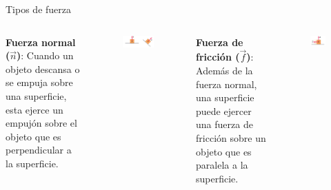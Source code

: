 \begin{frame}{Tipos de fuerza}

\begin{columns}
    \textbf{Fuerza normal ($\vec{n}$)}: Cuando un objeto descansa o se empuja sobre una superficie, esta ejerce un empujón sobre el objeto que es perpendicular a la superficie.
    \begin{figure}
        \centering
        \includegraphics[width=0.8\linewidth]{figures/normal.png}
    \end{figure}
    
    \textbf{Fuerza de fricción ($\vec{f}$)}: Además de la fuerza normal, una superficie puede ejercer una fuerza de fricción sobre un objeto que es paralela a la superficie.
    \begin{figure}
        \centering
        \includegraphics[width=0.5\linewidth]{figures/friccion.png}
    \end{figure}
\end{columns}
    
\end{frame}

